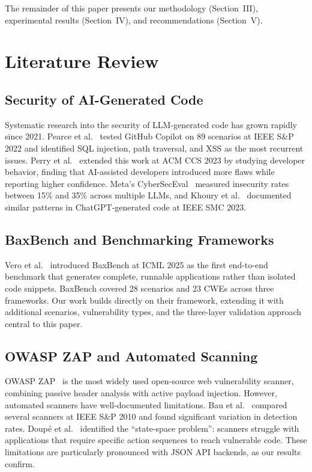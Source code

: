 \documentclass[conference,a4paper]{IEEEtran}
\begin{document}
The remainder of this paper presents our methodology (Section~III), experimental results (Section~IV), and recommendations (Section~V).

\section{Literature Review}

\subsection{Security of AI-Generated Code}
Systematic research into the security of LLM-generated code has grown rapidly since 2021. Pearce et al.~\cite{pearce2022} tested GitHub Copilot on 89 scenarios at IEEE S\&P 2022 and identified SQL injection, path traversal, and XSS as the most recurrent issues. Perry et al.~\cite{perry2023} extended this work at ACM CCS 2023 by studying developer behavior, finding that AI-assisted developers introduced more flaws while reporting higher confidence. Meta's CyberSecEval~\cite{bhatt2023} measured insecurity rates between 15\% and 35\% across multiple LLMs, and Khoury et al.~\cite{khoury2023} documented similar patterns in ChatGPT-generated code at IEEE SMC 2023.

\subsection{BaxBench and Benchmarking Frameworks}
Vero et al.~\cite{vero2025} introduced BaxBench at ICML 2025 as the first end-to-end benchmark that generates complete, runnable applications rather than isolated code snippets. BaxBench covered 28 scenarios and 23 CWEs across three frameworks. Our work builds directly on their framework, extending it with additional scenarios, vulnerability types, and the three-layer validation approach central to this paper.

\subsection{OWASP ZAP and Automated Scanning}
OWASP ZAP~\cite{owasp_zap} is the most widely used open-source web vulnerability scanner, combining passive header analysis with active payload injection. However, automated scanners have well-documented limitations. Bau et al.~\cite{bau2010} compared several scanners at IEEE S\&P 2010 and found significant variation in detection rates. Doup\'{e} et al.~\cite{doupe2010} identified the ``state-space problem'': scanners struggle with applications that require specific action sequences to reach vulnerable code. These limitations are particularly pronounced with JSON API backends, as our results confirm.
\end{document}
